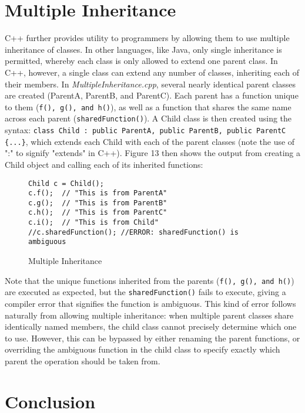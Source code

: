 \documentclass[11pt]{article}
\begin{document}
\section{Multiple Inheritance}
	
	C++ further provides utility to programmers by allowing them to use multiple inheritance of classes.  In other languages, like Java, only single inheritance is permitted, whereby each class is only allowed to extend one parent class.  In C++, however, a single class can extend any number of classes, inheriting each of their members.  In \textit{MultipleInheritance.cpp}, several nearly identical parent classes are created (ParentA, ParentB, and ParentC).  Each parent has a function unique to them (\texttt{f(), g(), and h()}), as well as a function that shares the same name across each parent (\texttt{sharedFunction()}).  A Child class is then created using the syntax: \texttt{class Child : public ParentA, public ParentB, public ParentC \{...\}}, which extends each Child with each of the parent classes (note the use of ":" to signify "extends" in C++).  Figure 13 then shows the output from creating a Child object and calling each of its inherited functions:

\begin{figure}[!h]
\centering
\begin{BVerbatim}
Child c = Child();
c.f();  // "This is from ParentA"
c.g();  // "This is from ParentB"
c.h();  // "This is from ParentC"
c.i();  // "This is from Child"
//c.sharedFunction(); //ERROR: sharedFunction() is ambiguous
\end{BVerbatim}
\caption{Multiple Inheritance}
\end{figure} \FloatBarrier

\noindent
Note that the unique functions inherited from the parents (\texttt{f(), g(), and h()}) are executed as expected, but the \texttt{sharedFunction()} fails to execute, giving a compiler error that signifies the function is ambiguous.  This kind of error follows naturally from allowing multiple inheritance: when multiple parent classes share identically named members, the child class cannot precisely determine which one to use.  However, this can be bypassed by either renaming the parent functions, or overriding the ambiguous function in the child class to specify exactly which parent the operation should be taken from.

\section{Conclusion}
\end{document}
